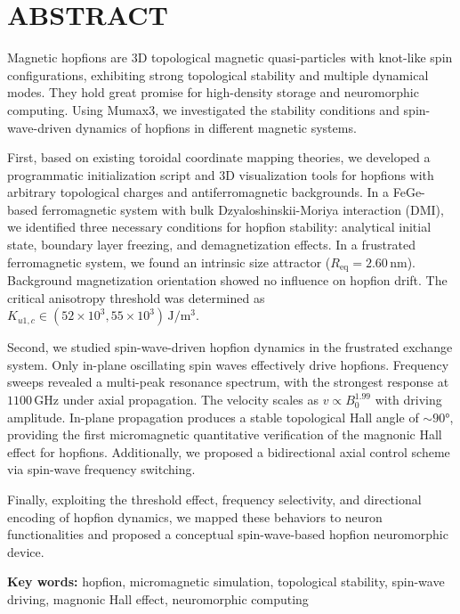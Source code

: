 \documentclass{article}
\begin{document}
\section*{ABSTRACT}

Magnetic hopfions are 3D topological magnetic quasi-particles with knot-like spin configurations, exhibiting strong topological stability and multiple dynamical modes. They hold great promise for high-density storage and neuromorphic computing. Using Mumax3, we investigated the stability conditions and spin-wave-driven dynamics of hopfions in different magnetic systems.

First, based on existing toroidal coordinate mapping theories, we developed a programmatic initialization script and 3D visualization tools for hopfions with arbitrary topological charges and antiferromagnetic backgrounds. In a FeGe-based ferromagnetic system with bulk Dzyaloshinskii-Moriya interaction (DMI), we identified three necessary conditions for hopfion stability: analytical initial state, boundary layer freezing, and demagnetization effects. In a frustrated ferromagnetic system, we found an intrinsic size attractor ($R_{\text{eq}} = 2.60\,\mathrm{nm}$). Background magnetization orientation showed no influence on hopfion drift. The critical anisotropy threshold was determined as $K_{u1,c} \in (52\times10^{3}, 55\times10^{3}) \, \mathrm{J/m^3}$.

Second, we studied spin-wave-driven hopfion dynamics in the frustrated exchange system. Only in-plane oscillating spin waves effectively drive hopfions. Frequency sweeps revealed a multi-peak resonance spectrum, with the strongest response at $1100\,\mathrm{GHz}$ under axial propagation. The velocity scales as $v \propto B_0^{1.99}$ with driving amplitude. In-plane propagation produces a stable topological Hall angle of $\sim 90°$, providing the first micromagnetic quantitative verification of the magnonic Hall effect for hopfions. Additionally, we proposed a bidirectional axial control scheme via spin-wave frequency switching.

Finally, exploiting the threshold effect, frequency selectivity, and directional encoding of hopfion dynamics, we mapped these behaviors to neuron functionalities and proposed a conceptual spin-wave-based hopfion neuromorphic device.



\textbf{Key words: } hopfion, micromagnetic simulation, topological stability, spin-wave driving, magnonic Hall effect, neuromorphic computing
\end{document}
